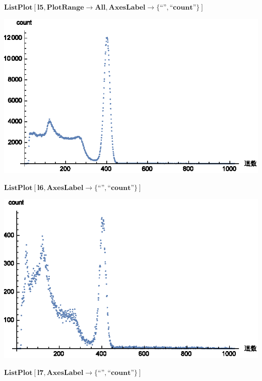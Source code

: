 \documentclass{article}
\newcommand{\unicode}[1]{{}}
\begin{document}
\begin{doublespace}
\noindent\(\pmb{\text{ListPlot}[\text{l5},\text{PlotRange}\to \text{All},\text{AxesLabel}\to \{\text{{``}$\unicode{9053}\unicode{6570}${''}},\text{{``}count{''}}\}]}\)
\end{doublespace}

\includegraphics{data_gr4.eps}

\begin{doublespace}
\noindent\(\pmb{\text{ListPlot}[\text{l6},\text{AxesLabel}\to \{\text{{``}$\unicode{9053}\unicode{6570}${''}},\text{{``}count{''}}\}]}\)
\end{doublespace}

\includegraphics{data_gr5.eps}

\begin{doublespace}
\noindent\(\pmb{\text{ListPlot}[\text{l7},\text{AxesLabel}\to \{\text{{``}$\unicode{9053}\unicode{6570}${''}},\text{{``}count{''}}\}]}\)
\end{doublespace}
\end{document}
